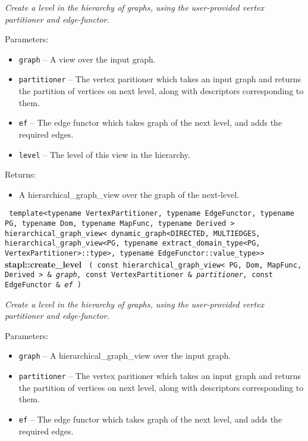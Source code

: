\textit{
Create a level in the hierarchy of graphs, using the user-provided vertex partitioner and edge-functor.
}
\vspace{0.4cm}

Parameters:
\begin{itemize}
\item
\texttt{graph} --
A view over the input graph.
\item
\texttt{partitioner} --
The vertex paritioner which takes an input graph and returns the partition of vertices on next level, along with descriptors corresponding to them.
\item
\texttt{ef} --
The edge functor which takes graph of the next level, and adds the required edges.
\item
\texttt{level} --
The level of this view in the hierarchy.
\end{itemize}

Returns:
\begin{itemize}
\item
A hierarchical\_graph\_view over the graph of the next-level. 
\end{itemize}


\noindent
\texttt{%
template<typename VertexPartitioner, typename EdgeFunctor, 
\newline
typename PG, typename Dom, typename MapFunc, typename Derived >
\newline
hierarchical\_graph\_view< dynamic\_graph<DIRECTED, MULTIEDGES, 
\newline
hierarchical\_graph\_view<PG, typename extract\_domain\_type<PG, 
\newline
VertexPartitioner>::type>, typename EdgeFunctor::value\_type>> 
}
\textbf{stapl::create\_level}%
\newline
\texttt{%
(
const hierarchical\_graph\_view< PG, Dom, MapFunc, Derived > \&
\textit{graph,}%
const VertexPartitioner \&
\textit{partitioner,}%
const EdgeFunctor \&
\textit{ef}%
)     
}
\vspace{0.4cm}

\textit{
Create a level in the hierarchy of graphs, using the user-provided vertex partitioner and edge-functor.
}
\vspace{0.4cm}

Parameters:
\begin{itemize}
\item
\texttt{graph} --
A hierarchical\_graph\_view over the input graph.
\item
\texttt{partitioner} --
The vertex paritioner which takes an input graph and returns the partition of vertices on next level, along with descriptors corresponding to them.
\item
\texttt{ef} --
The edge functor which takes graph of the next level, and adds the required edges.
\end{itemize}

